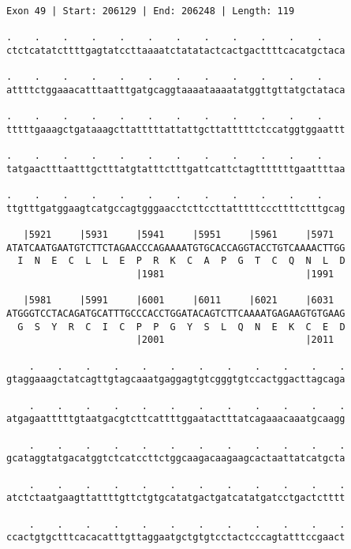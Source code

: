 \documentclass{article}
\begin{document}
\begin{Verbatim}[fontfamily=courier]
Exon 49 | Start: 206129 | End: 206248 | Length: 119

.    .    .    .    .    .    .    .    .    .    .    .    
ctctcatatcttttgagtatccttaaaatctatatactcactgacttttcacatgctaca

.    .    .    .    .    .    .    .    .    .    .    .    
attttctggaaacatttaatttgatgcaggtaaaataaaatatggttgttatgctataca

.    .    .    .    .    .    .    .    .    .    .    .    
tttttgaaagctgataaagcttatttttattattgcttatttttctccatggtggaattt

.    .    .    .    .    .    .    .    .    .    .    .    
tatgaactttaatttgctttatgtatttctttgattcattctagtttttttgaattttaa

.    .    .    .    .    .    .    .    .    .    .    .    
ttgtttgatggaagtcatgccagtgggaacctcttccttatttttcccttttctttgcag

   |5921     |5931     |5941     |5951     |5961     |5971  
ATATCAATGAATGTCTTCTAGAACCCAGAAAATGTGCACCAGGTACCTGTCAAAACTTGG
  I  N  E  C  L  L  E  P  R  K  C  A  P  G  T  C  Q  N  L  D
                       |1981                         |1991  

   |5981     |5991     |6001     |6011     |6021     |6031  
ATGGGTCCTACAGATGCATTTGCCCACCTGGATACAGTCTTCAAAATGAGAAGTGTGAAG
  G  S  Y  R  C  I  C  P  P  G  Y  S  L  Q  N  E  K  C  E  D
                       |2001                         |2011  

    .    .    .    .    .    .    .    .    .    .    .    .
gtaggaaagctatcagttgtagcaaatgaggagtgtcgggtgtccactggacttagcaga

    .    .    .    .    .    .    .    .    .    .    .    .
atgagaatttttgtaatgacgtcttcattttggaatactttatcagaaacaaatgcaagg

    .    .    .    .    .    .    .    .    .    .    .    .
gcataggtatgacatggtctcatccttctggcaagacaagaagcactaattatcatgcta

    .    .    .    .    .    .    .    .    .    .    .    .
atctctaatgaagttattttgttctgtgcatatgactgatcatatgatcctgactctttt

    .    .    .    .    .    .    .    .    .    .    .    .
ccactgtgctttcacacatttgttaggaatgctgtgtcctactcccagtatttccgaact
\end{Verbatim}
\newpage
\end{document}
